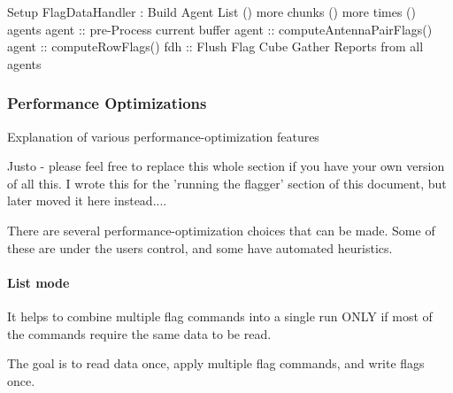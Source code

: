 \begin{algorithm}
  \SetLine
  \dontprintsemicolon
  \vspace{0.5cm} 
  \vspace{0.5cm} 
  {Setup FlagDataHandler :} \;
  {Build Agent List }\;
  \While () { more chunks }
  {
    \While () { more times }
    {
      \ForAll () { agents }
      {
        {
          {agent :: pre-Process current buffer}\;
             {
               {
                  {agent :: computeAntennaPairFlags()}\;
               }
             }
             {
               {
                {agent :: computeRowFlags() }\;
               }
             }
        }
      }
    }
    {fdh :: Flush Flag Cube}\;
  }
  {Gather Reports from all agents} \;
\end{algorithm}





\subsubsection{Performance Optimizations}

{\green  Explanation of various performance-optimization features  


Justo - please feel free to replace this whole section if you have your own version of all this.  
I wrote this for the 'running the flagger' section of this document, but later moved 
it here instead....

}


There are several performance-optimization choices that can be made. 
Some of these are under the users control, and some have automated heuristics.

\paragraph{List mode}

It helps to combine multiple flag commands into a single run ONLY if most of the
commands require the same data to be read.  

The goal is to read data once, apply multiple flag commands, and write flags once.

